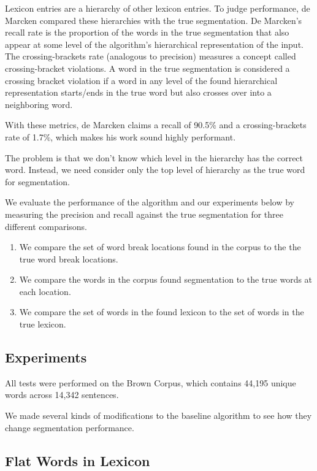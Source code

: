 \documentclass[11pt, oneside, fleqn]{article}
\begin{document}
	Lexicon entries are a hierarchy of other lexicon entries. To judge performance, de Marcken compared these hierarchies with the true segmentation. De Marcken's recall rate is the proportion of the words in the true segmentation that also appear at some level of the algorithm's hierarchical representation of the input. The crossing-brackets rate (analogous to precision) measures a concept called crossing-bracket violations. A word in the true segmentation is considered a crossing bracket violation if a word in any level of the found hierarchical representation starts/ends in the true word but also crosses over into a neighboring word.
    
    With these metrics, de Marcken claims a recall of 90.5\% and a crossing-brackets rate of 1.7\%, which makes his work sound highly performant.

	The problem is that we don't know which level in the hierarchy has the correct word. Instead, we need consider only the top level of hierarchy as the true word for segmentation.

	We evaluate the performance of the algorithm and our experiments below by measuring the precision and recall against the true segmentation for three different comparisons.
	
	\begin{enumerate}
		\item We compare the set of word break locations found in the corpus to the the true word break locations.
		\item We compare the words in the corpus found segmentation to the true words at each location.
		\item We compare the set of words in the found lexicon to the set of words in the true lexicon.
	\end{enumerate}

  \subsection*{Experiments}
  
  All tests were performed on the Brown Corpus, which contains 44,195 unique words across 14,342 sentences. 
  
  We made several kinds of modifications to the baseline algorithm to see how they change segmentation performance.

  \subsection*{Flat Words in Lexicon}
  
\end{document}
